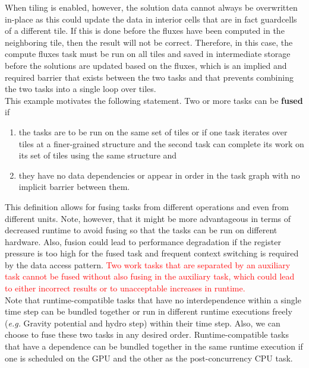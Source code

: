 \documentclass{article}
\begin{document}
When tiling is enabled, however, the solution data cannot always be overwritten
in-place as this could update the data in interior cells that are in fact
guardcells of a different tile.  If this is done before the fluxes have been
computed in the neighboring tile, then the result will not be correct.
Therefore, in this case, the compute fluxes task must be run on all tiles and
saved in intermediate storage before the solutions are updated based on the
fluxes, which is an implied and required barrier that exists between
the two tasks and that prevents combining the two tasks into a single loop over
tiles.\\


This example motivates the following statement.  Two or more tasks can be
\textbf{fused} if
\begin{enumerate}
\item{the tasks are to be run on the same set of tiles or if one task 
iterates over tiles at a finer-grained structure and the second task can
complete its work on its set of tiles using the same structure and}
\item{they have no data dependencies or appear in order in the task graph with
no implicit barrier between them.}
\end{enumerate}
This definition allows for fusing tasks from different operations and even from
different units.
Note, however, that it might be more advantageous in terms of decreased runtime
to avoid fusing so that the tasks can be run on different hardware.  Also,
fusion could lead to performance degradation if the register pressure is too
high for the fused task and frequent context switching is required by the data
access pattern.  \textcolor{red}{Two work tasks that are separated by
an auxiliary task cannot be fused without also fusing in the auxiliary task,
which could lead to either incorrect results or to unacceptable increases in
runtime.}\\

Note that runtime-compatible tasks that have no interdependence within a single
time step can be bundled together or run in different runtime executions freely
(\textit{e.g.} Gravity potential and hydro step) within their time step.  Also,
we can choose to fuse these two tasks in any desired order.  Runtime-compatible
tasks that have a dependence can be bundled together in the same runtime
execution if one is scheduled on the GPU and the other as the 
post-concurrency CPU task.\\
\end{document}
